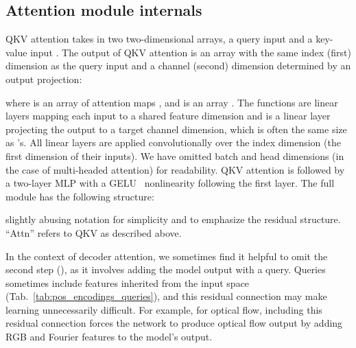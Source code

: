 \documentclass{article} \usepackage{iclr2022_conference,times}
\begin{document}
\subsection{Attention module internals}

QKV attention takes in two two-dimensional arrays, a query input  and a key-value input . The output of QKV attention is an array with the same index (first) dimension as the query input and a channel (second) dimension determined by an output projection:



where  is an array of attention maps , and  is an array . The functions  are linear layers mapping each input to a shared feature dimension  and  is a linear layer projecting the output to a target channel dimension, which is often the same size as 's. All linear layers are applied convolutionally over the index dimension (the first dimension of their inputs). We have omitted batch and head dimensions (in the case of multi-headed attention) for readability. 
QKV attention is followed by a two-layer MLP with a GELU~\citep{hendrycks2016gelu} nonlinearity following the first layer. The full module has the following structure:



slightly abusing notation for simplicity and to emphasize the residual structure. ``Attn'' refers to QKV as described above. 

In the context of decoder attention, we sometimes find it helpful to omit the second step (), as it involves adding the model output with a query. Queries sometimes include features inherited from the input space (Tab.~\ref{tab:pos_encodings_queries}), and this residual connection may make learning unnecessarily difficult. For example, for optical flow, including this residual connection forces the network to produce optical flow output by adding RGB and Fourier features to the model's output.
\end{document}
